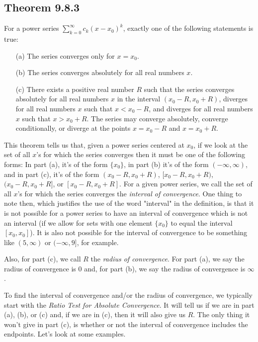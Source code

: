 \documentclass{article}
\begin{document}
\subsection*{Theorem 9.8.3}
For a power series $\sum_{k=0}^{\infty} c_k (x - x_0)^k$, exactly one of the following statements is true:
\begin{itemize}
    \item[(a)] The series converges only for $x = x_0$.
    \item[(b)] The series converges absolutely for all real numbers $x$.
    \item[(c)] There exists a positive real number $R$ such that the series converges absolutely for all real numbers $x$ in the interval $(x_0 - R, x_0 + R)$, diverges for all real numbers $x$ such that $x < x_0 - R$, and diverges for all real numbers $x$ such that $x > x_0 + R$. The series may converge absolutely, converge conditionally, or diverge at the points $x = x_0 - R$ and $x = x_0 + R$.
\end{itemize}

This theorem tells us that, given a power series centered at $x_0$, if we look at the set of all $x$'s for which the series converges then it must be one of the following forms: In part (a), it's of the form $\{x_0\}$, in part (b) it's of the form $(-\infty, \infty)$, and in part (c), it's of the form $(x_0 - R, x_0 + R)$, $[x_0 - R, x_0 + R)$, $(x_0 - R, x_0 + R]$, or $[x_0 - R, x_0 + R]$. For a given power series, we call the set of all $x$'s for which the series converges the \textit{interval of convergence}. One thing to note then, which justifies the use of the word "interval" in the definition, is that it is not possible for a power series to have an interval of convergence which is not an interval (if we allow for sets with one element $\{x_0\}$ to equal the interval $[x_0, x_0]$). It is also not possible for the interval of convergence to be something like $(5, \infty)$ or $(-\infty, 9]$, for example.

Also, for part (c), we call $R$ the \textit{radius of convergence}. For part (a), we say the radius of convergence is $0$ and, for part (b), we say the radius of convergence is $\infty$.

To find the interval of convergence and/or the radius of convergence, we typically start with the \textit{Ratio Test for Absolute Convergence}. It will tell us if we are in part (a), (b), or (c) and, if we are in (c), then it will also give us $R$. The only thing it won't give in part (c), is whether or not the interval of convergence includes the endpoints. Let's look at some examples.
\end{document}
